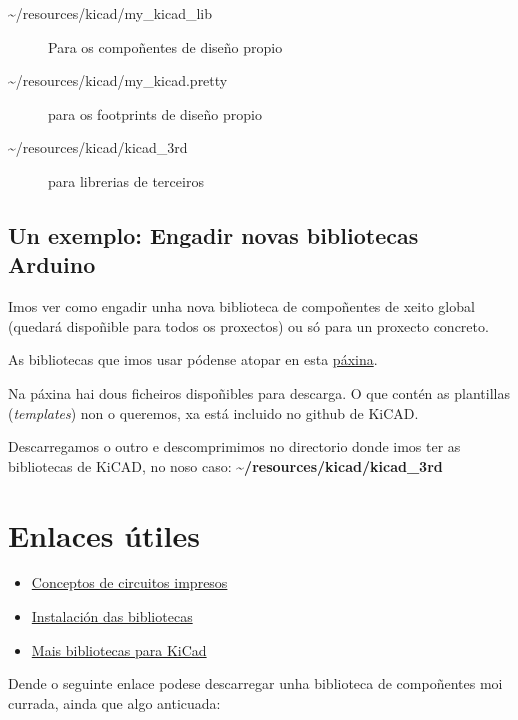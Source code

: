 \begin{description}
\item[\textasciitilde{}/resources/kicad/my\_kicad\_lib]
Para os compoñentes de diseño propio
\item[\textasciitilde{}/resources/kicad/my\_kicad.pretty]
para os footprints de diseño propio
\item[\textasciitilde{}/resources/kicad/kicad\_3rd]
para librerias de terceiros
\end{description}

\subsection{Un exemplo: Engadir novas bibliotecas
Arduino}\label{un-exemplo-engadir-novas-bibliotecas-arduino}

Imos ver como engadir unha nova biblioteca de compoñentes de xeito
global (quedará dispoñible para todos os proxectos) ou só para un
proxecto concreto.

As bibliotecas que imos usar pódense atopar en esta
\href{http://meta-blog.eklablog.com/kicad-librairie-arduino-pretty-p930786}{páxina}.

Na páxina hai dous ficheiros dispoñibles para descarga. O que contén as
plantillas (\emph{templates}) non o queremos, xa está incluido no github
de KiCAD.

Descarregamos o outro e descomprimimos no directorio donde imos ter as
bibliotecas de KiCAD, no noso caso:
\textbf{\textasciitilde{}/resources/kicad/kicad\_3rd}

\section{Enlaces útiles}\label{enlaces-uxfatiles}

\begin{itemize}
\itemsep1pt\parskip0pt
\item
  \href{http://www.pcb.electrosoft.cl/04-articulos-circuitos-impresos-desarrollo-sistemas/01-conceptos-circuitos-impresos/conceptos-circuitos-impresos-pcb.html}{Conceptos
  de circuitos impresos}
\item
  \href{http://www.arunet.co.uk/tkboyd/ele2pcbka.htm}{Instalación das
  bibliotecas}
\item
  \href{http://www.kicadlib.org/}{Mais bibliotecas para KiCad}
\end{itemize}

Dende o seguinte enlace podese descarregar unha biblioteca de
compoñentes moi currada, ainda que algo anticuada:

